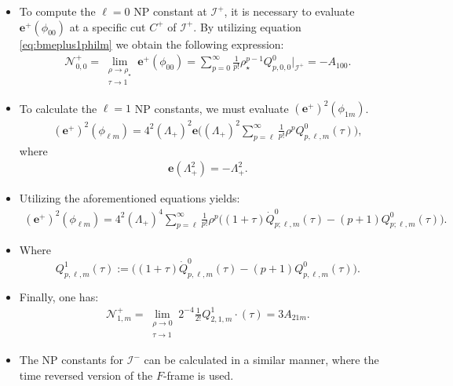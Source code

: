 \documentclass{beamer}
\theoremstyle{remark}
\theoremstyle{plain}
\theoremstyle{plain}
\begin{document}
\begin{frame}
  \begin{itemize}
    \item To compute the $\ell=0$ NP constant at $\mathscr{I}^{+}$, it is necessary to evaluate $\boldsymbol{e}^{+}(\phi_{00})$ at a specific cut ${C}^{+}$ of $\mathscr{I}^{+}$. By utilizing equation \eqref{eq:bmeplus1philm} we obtain the following expression:
    \begin{align}
      \mathcal{N}^{+}_{0,0}= \lim_{\substack{\rho \to \rho_{\star} \\ \tau \to 1}}  \boldsymbol{e}^{+}(\phi_{00}) =\sum_{p=0}^{\infty} \frac{1}{p!}\rho^{p-1}_{\star}Q^{0}_{p,0,0}|_{\mathscr{I}^{+}} = -A_{100}.
    \end{align}
    \item To calculate the $\ell = 1$ NP constants, we must evaluate $(\boldsymbol{e}^{+})^{2}(\phi_{1m})$.\\
    \begin{align}\label{eq:bmeplus2philmraw}
      (\boldsymbol{e}^{+})^2(\phi_{\ell m})= 4^2(\Lambda_{+})^{2}\boldsymbol{e} \Big((\Lambda_{+}{})^2 \sum_{p=\ell}^{\infty}\frac{1}{p!}\rho^{p}Q^{0}_{p,\ell,m}(\tau)\Big),
    \end{align}
    where
    \begin{align}\label{eq:defQ1}
      \boldsymbol{e}\left(\Lambda_{+}^{2}\right)= -\Lambda_{+}^{2}.
    \end{align}
    \item Utilizing the aforementioned equations yields:
    \begin{align}\label{eq:defQ1}
      (\boldsymbol{e}^{+})^2(\phi_{\ell m})= 4^2(\Lambda_{+})^{4}\sum_{p=\ell}^{\infty} \frac{1}{p!}\rho^{p}\big((1+\tau)\dot{Q}^{0}_{p;\ell,m}(\tau)-(p+1){Q}^{0}_{p;\ell,m}(\tau)\big).
    \end{align}
  \end{itemize}
\end{frame}

\begin{frame}
  \begin{itemize}
    \item Where
    \begin{equation}
      Q^{1}_{p,\ell,m}(\tau):= \big((1+\tau)\dot{Q}^{0}_{p,\ell,m}(\tau)-(p+1){Q}^{0}_{p,\ell,m}(\tau)\big).
    \end{equation}
    \item Finally, one has:
    \begin{align}
      \mathcal{N}^{+}_{1,m} = \lim _{\substack{\rho \rightarrow 0 \\ \tau \rightarrow 1}}2^{-4} \frac{1}{2 !} Q^{1}_{2, 1, m}\cdot(\tau) = 3A_{21m}.
    \end{align}
    \item The NP constants for $\mathscr{I}^{-}$ can be calculated in a similar manner, where the time reversed version of the $F$-frame is used.
  \end{itemize}
\end{frame}
\end{document}
